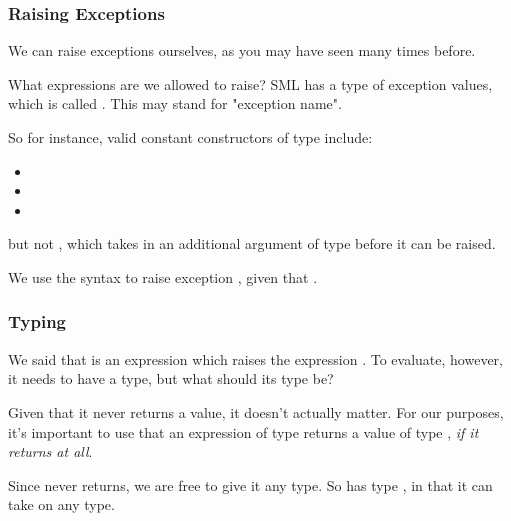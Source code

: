 \documentclass[aspectratio=169]{beamer}
\begin{document}
\begin{frame}[fragile]
  \frametitle{Raising Exceptions}

  We can raise exceptions ourselves, as you may have seen many times before.

  \pause
  \vspace{\fill}

  What expressions are we allowed to raise? SML has a type of exception values,
  which is called . This may stand for "exception name".

  \pause
  \vspace{\fill}

  So for instance, valid constant constructors of type  include:
  \begin{itemize}
    \item {}
    \item {}
    \item {}
  \end{itemize}

  \pause
  but not , which takes in an additional argument
  of type  before it can be raised.

  \pause
  \vspace{\fill}

  We use the syntax  to raise exception , given that
  .

  \pause
  \vspace{\fill}

\end{frame}

\begin{frame}[fragile]
  \frametitle{Typing }

  We said that  is an expression which raises the expression
  . To evaluate, however, it needs to have a type, but what should
  its type be?

  \pause
  \vspace{\fill}

  Given that it never returns a value, it doesn't actually matter. For our
  purposes, it's important to use that an expression of type 
  returns a value of type , \textit{if it returns at all}.

  \pause
  \vspace{\fill}

  Since  never returns, we are free to give it any type. So
   has type , in that it can take on any type.
\end{frame}
\end{document}
